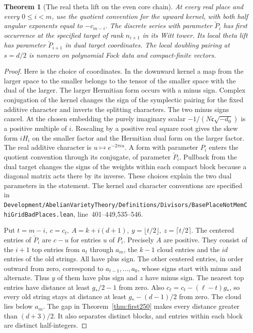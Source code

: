 \documentclass[a4paper,11pt]{article}
\newtheorem{theorem}[proposition]{Theorem}
\theoremstyle{definition}
\theoremstyle{remark}
\newcommand{\srcloc}[2]{{\small\nolinkurl{#1.lean}}, line~#2}
\numberwithin{equation}{section}
\begin{document}
\begin{theorem}[The real theta lift on the even core chain]\leavevmode
\label{thm:realcore253}
At every real place and every \(0\le i<m\), use the quotient
convention for the upward kernel, with both half angular exponents
equal to \(-c_{m-i}\). The discrete series with parameter \(\check P_i\)
has first occurrence at the specified target of rank \(n_{i+1}\) in
its Witt tower. Its local theta lift has parameter \(\check P_{i+1}\)
in dual target coordinates. The local doubling pairing at \(s=d/2\)
is nonzero on polynomial Fock data and compact-finite vectors.
\end{theorem}
\begin{proof}
Here is the choice of coordinates. In the downward kernel a map
from the larger space to the smaller belongs to the tensor of the
smaller space with the dual of the larger. The larger Hermitian
form occurs with a minus sign. Complex conjugation of the kernel
changes the sign of the symplectic pairing for the fixed additive
character and inverts the splitting characters. The two minus signs
cancel. At the chosen embedding the purely imaginary scalar
\(-1/(N\mathfrak c\sqrt{-d_0})\) is a positive multiple of \(i\).
Rescaling by a positive real square root gives the skew form
\(iH_i\) on the smaller factor and the Hermitian dual form on the
larger factor. The real additive character is \(u\mapsto e^{-2\pi i u}\).
A form with parameter \(P_i\) enters the quotient convention through
its conjugate, of parameter \(\check P_i\). Pullback from the dual
target changes the signs of the weights within each compact block
because a diagonal matrix acts there by its inverse. These choices
explain the two dual parameters in the statement. The kernel and
character conventions are specified in
\srcloc{Development/AbelianVarietyTheory/Definitions/Divisors/BasePlaceNotMemChiGridBadPlaces}{401--449,535--546}.

Put \(t=m-i,\ c=c_t,\ A=k+i(d+1),\ y=\lfloor t/2\rfloor,\
z=\lceil t/2\rceil\). The centered entries of \(\check P_i\) are
\(c-u\) for entries \(u\) of \(P_i\). Precisely \(A\) are positive.
They consist of the \(i+1\) top entries from \(a_t\) through \(a_m\),
the \(k-1\) cloud entries and the \(id\) entries of the old
strings. All have plus sign. The other centered entries, in order
outward from zero, correspond to \(a_{t-1},\ldots,a_0\), whose
signs start with minus and alternate. Thus \(y\) of them have plus
sign and \(z\) have minus sign. The nearest top entries have
distance at least \(g_*/2-1\) from zero. Also
\(c_\ell=c_t-(\ell-t)g_*\), so every old string stays at distance
at least \(g_*-(d-1)/2\) from zero. The cloud lies below \(a_m\).
The gap in Theorem~\ref{thm:first250} makes every distance
greater than \((d+3)/2\). It also separates distinct blocks, and
entries within each block are distinct half-integers.


\end{proof}
\end{document}
